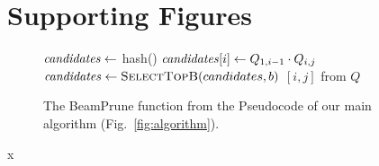 \newpage
\section{Supporting Figures}

\begin{figure}[h]%
\center
\small
  \algrenewcommand\algorithmicindent{1.5em}%
\begin{minipage}{0.85\textwidth}
\begin{algorithmic}[1]
  \newcommand{\INDSTATE}[1][1]{\State\hspace{#1\algorithmicindent}}
    \State $\mathit{candidates} \gets$ hash() 
        \State $\mathit{candidates}[i] \gets Q_{{{1}}, {{i-1}}} \cdot Q_{{{i}}, {{j}}}$ 
    \EndFor
    \State $\mathit{candidates} \gets \textsc {SelectTopB}(candidates, b)$ 
             $[i,j]$ from $Q$ 
        \EndIf
    \EndFor
\EndFunction
\end{algorithmic}
\end{minipage}
\caption{
The {\sc BeamPrune} function from the Pseudocode of our main algorithm (Fig.~\ref{fig:algorithm}).
\label{fig:beam_prune_alg}}
\end{figure}x


